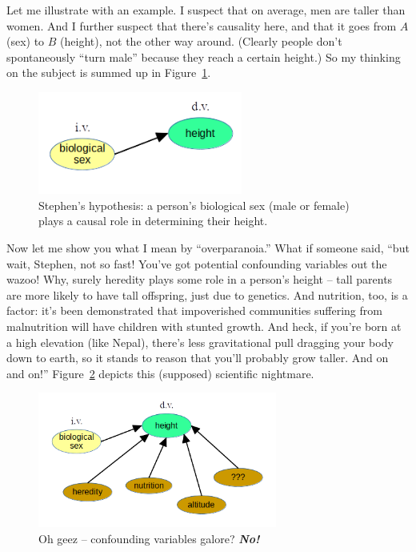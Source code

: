 Let me illustrate with an example. I suspect that on average, men are taller
than women. And I further suspect that there's causality here, and that it goes
from $A$ (sex) to $B$ (height), not the other way around. (Clearly people don't
spontaneously ``turn male'' because they reach a certain height.) So my
thinking on the subject is summed up in Figure~\ref{fig:sexHeight}.

\begin{figure}[ht]
\centering
\includegraphics[width=0.6\textwidth]{sexHeight.png}
\caption{Stephen's hypothesis: a person's biological sex (male or female) plays
a causal role in determining their height.}
\label{fig:sexHeight}
\end{figure}

Now let me show you what I mean by ``overparanoia.'' What if someone said,
``but wait, Stephen, not so fast! You've got potential confounding variables
out the wazoo! Why, surely heredity plays some role in a person's height --
tall parents are more likely to have tall offspring, just due to genetics. And
nutrition, too, is a factor: it's been demonstrated that impoverished
communities suffering from malnutrition will have children with stunted growth.
And heck, if you're born at a high elevation (like Nepal), there's less
gravitational pull dragging your body down to earth, so it stands to reason
that you'll probably grow taller. And on and on!'' Figure~\ref{fig:sexHeight2}
depicts this (supposed) scientific nightmare.

\begin{figure}[ht]
\centering
\includegraphics[width=0.7\textwidth]{sexHeight2.png}
\caption{Oh geez -- confounding variables galore? \textbf{\textit{No!}}}
\label{fig:sexHeight2}
\end{figure}

